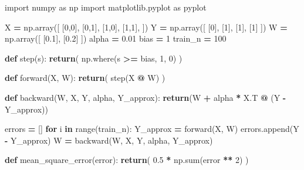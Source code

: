 \documentclass[
]{book}
\newenvironment{Shaded}{\begin{snugshade}}{\end{snugshade}}
\newcommand{\BuiltInTok}[1]{#1}
\newcommand{\ControlFlowTok}[1]{\textcolor[rgb]{0.13,0.29,0.53}{\textbf{#1}}}
\newcommand{\DecValTok}[1]{\textcolor[rgb]{0.00,0.00,0.81}{#1}}
\newcommand{\FloatTok}[1]{\textcolor[rgb]{0.00,0.00,0.81}{#1}}
\newcommand{\ImportTok}[1]{#1}
\newcommand{\KeywordTok}[1]{\textcolor[rgb]{0.13,0.29,0.53}{\textbf{#1}}}
\newcommand{\NormalTok}[1]{#1}
\newcommand{\OperatorTok}[1]{\textcolor[rgb]{0.81,0.36,0.00}{\textbf{#1}}}
\begin{document}
\begin{Shaded}
\begin{Highlighting}[]
\ImportTok{import}\NormalTok{ numpy }\ImportTok{as}\NormalTok{ np}
\ImportTok{import}\NormalTok{ matplotlib.pyplot }\ImportTok{as}\NormalTok{ pyplot}


\NormalTok{X }\OperatorTok{=}\NormalTok{ np.array([}
\NormalTok{  [}\DecValTok{0}\NormalTok{,}\DecValTok{0}\NormalTok{],}
\NormalTok{  [}\DecValTok{0}\NormalTok{,}\DecValTok{1}\NormalTok{],}
\NormalTok{  [}\DecValTok{1}\NormalTok{,}\DecValTok{0}\NormalTok{],}
\NormalTok{  [}\DecValTok{1}\NormalTok{,}\DecValTok{1}\NormalTok{],}
\NormalTok{])}
\NormalTok{Y }\OperatorTok{=}\NormalTok{ np.array([}
\NormalTok{  [}\DecValTok{0}\NormalTok{],}
\NormalTok{  [}\DecValTok{1}\NormalTok{],}
\NormalTok{  [}\DecValTok{1}\NormalTok{],}
\NormalTok{  [}\DecValTok{1}\NormalTok{]}
\NormalTok{])}
\NormalTok{W }\OperatorTok{=}\NormalTok{ np.array([}
\NormalTok{  [}\FloatTok{0.1}\NormalTok{], }
\NormalTok{  [}\FloatTok{0.2}\NormalTok{]}
\NormalTok{])}
\NormalTok{alpha }\OperatorTok{=} \FloatTok{0.01}
\NormalTok{bias }\OperatorTok{=} \DecValTok{1}
\NormalTok{train\_n }\OperatorTok{=} \DecValTok{100}

\KeywordTok{def}\NormalTok{ step(s):}
  \ControlFlowTok{return}\NormalTok{( np.where(s }\OperatorTok{\textgreater{}=}\NormalTok{ bias, }\DecValTok{1}\NormalTok{, }\DecValTok{0}\NormalTok{) )}


\KeywordTok{def}\NormalTok{ forward(X, W):}
  \ControlFlowTok{return}\NormalTok{( step(X }\OperatorTok{@}\NormalTok{ W) )}

\KeywordTok{def}\NormalTok{ backward(W, X, Y, alpha, Y\_approx):}
  \ControlFlowTok{return}\NormalTok{(W }\OperatorTok{+}\NormalTok{ alpha }\OperatorTok{*}\NormalTok{ X.T }\OperatorTok{@}\NormalTok{ (Y }\OperatorTok{{-}}\NormalTok{ Y\_approx))}
  
  
\NormalTok{errors }\OperatorTok{=}\NormalTok{ []}
\ControlFlowTok{for}\NormalTok{ i }\KeywordTok{in} \BuiltInTok{range}\NormalTok{(train\_n):}
\NormalTok{  Y\_approx }\OperatorTok{=}\NormalTok{ forward(X, W)}
\NormalTok{  errors.append(Y }\OperatorTok{{-}}\NormalTok{ Y\_approx)}
\NormalTok{  W }\OperatorTok{=}\NormalTok{ backward(W, X, Y, alpha, Y\_approx)}
  
  
  
\KeywordTok{def}\NormalTok{ mean\_square\_error(error):}
  \ControlFlowTok{return}\NormalTok{( }\FloatTok{0.5} \OperatorTok{*}\NormalTok{ np.}\BuiltInTok{sum}\NormalTok{(error }\OperatorTok{**} \DecValTok{2}\NormalTok{) )}



\end{Highlighting}
\end{Shaded}
\end{document}
